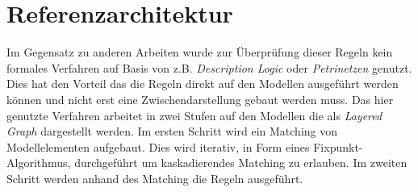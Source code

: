 \section{Referenzarchitektur}

Im Gegensatz zu anderen Arbeiten wurde zur Überprüfung dieser Regeln kein formales Verfahren auf Basis von z.B. \emph{Description Logic} oder \emph{Petrinetzen} genutzt.
Dies hat den Vorteil das die Regeln direkt auf den Modellen ausgeführt werden können und nicht erst eine Zwischendarstellung gebaut werden muss.
Das hier genutzte Verfahren arbeitet in zwei Stufen auf den Modellen die als \emph{Layered Graph} dargestellt werden.
Im ersten Schritt wird ein Matching von Modellelementen aufgebaut. Dies wird iterativ, in Form eines Fixpunkt-Algorithmus, durchgeführt um kaskadierendes Matching zu erlauben.
Im zweiten Schritt werden anhand des Matching die Regeln ausgeführt.
